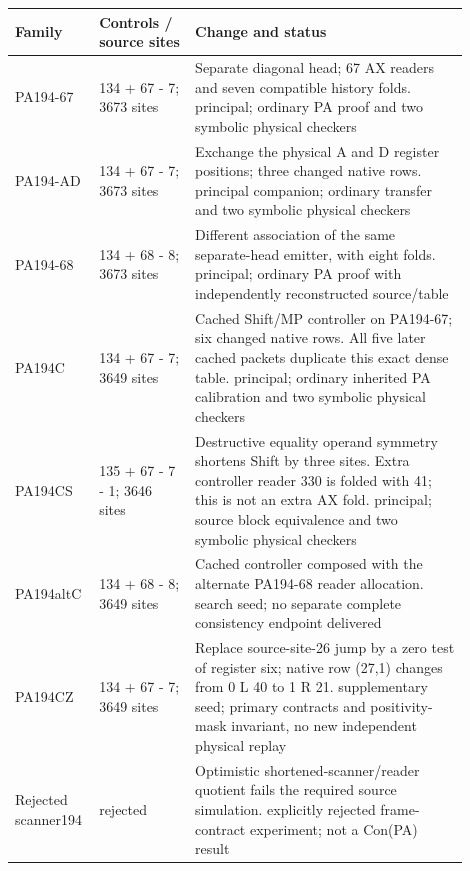\begin{longtable}{@{}p{0.12\linewidth}p{0.20\linewidth}p{0.58\linewidth}@{}}
\toprule Family & Controls / source sites & Change and status\\\midrule\endhead
PA194-67 & 134 + 67 - 7; 3673 sites & Separate diagonal head; 67 AX readers and seven compatible history folds. principal; ordinary PA proof and two symbolic physical checkers\\[4pt]
PA194-AD & 134 + 67 - 7; 3673 sites & Exchange the physical A and D register positions; three changed native rows. principal companion; ordinary transfer and two symbolic physical checkers\\[4pt]
PA194-68 & 134 + 68 - 8; 3673 sites & Different association of the same separate-head emitter, with eight folds. principal; ordinary PA proof with independently reconstructed source/table\\[4pt]
PA194C & 134 + 67 - 7; 3649 sites & Cached Shift/MP controller on PA194-67; six changed native rows. All five later cached packets duplicate this exact dense table. principal; ordinary inherited PA calibration and two symbolic physical checkers\\[4pt]
PA194CS & 135 + 67 - 7 - 1; 3646 sites & Destructive equality operand symmetry shortens Shift by three sites. Extra controller reader 330 is folded with 41; this is not an extra AX fold. principal; source block equivalence and two symbolic physical checkers\\[4pt]
PA194altC & 134 + 68 - 8; 3649 sites & Cached controller composed with the alternate PA194-68 reader allocation. search seed; no separate complete consistency endpoint delivered\\[4pt]
PA194CZ & 134 + 67 - 7; 3649 sites & Replace source-site-26 jump by a zero test of register six; native row (27,1) changes from 0 L 40 to 1 R 21. supplementary seed; primary contracts and positivity-mask invariant, no new independent physical replay\\[4pt]
Rejected scanner194 & rejected & Optimistic shortened-scanner/reader quotient fails the required source simulation. explicitly rejected frame-contract experiment; not a Con(PA) result\\[4pt]
\bottomrule
\end{longtable}
